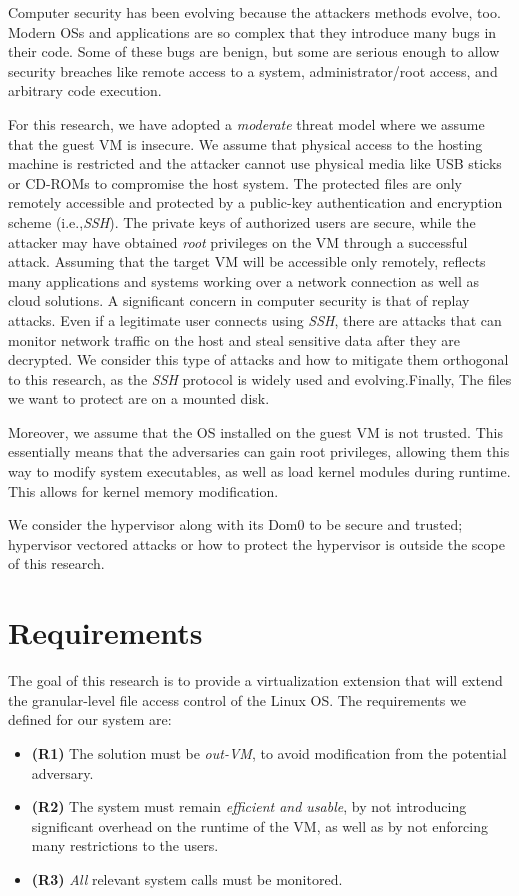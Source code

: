 Computer security has been evolving because the attackers methods evolve, too. Modern \acp{OS} and applications are so complex that they introduce many bugs in their code. Some of these bugs are benign, but some are serious enough to allow security breaches like remote access to a system, administrator/root access, and arbitrary code execution.

\par For this research, we have adopted a \emph{moderate} threat model where we assume that the guest \ac{VM} is insecure. We assume that physical access to the hosting machine is restricted and the attacker cannot use physical media like USB sticks or CD-ROMs to compromise the host system. The protected files are only remotely accessible and protected  by  a  public-key  authentication  and  encryption scheme (i.e.,\emph{SSH}). The  private  keys  of  authorized  users  are  secure, while the attacker may have obtained \emph{root} privileges on the \ac{VM} through a successful attack. Assuming that the target \ac{VM} will be accessible only remotely, reflects many applications and systems working over a network connection as well as cloud solutions. A significant  concern  in  computer security is that of replay attacks. Even if a legitimate user connects using \emph{SSH}, there are attacks that can monitor  network  traffic  on  the  host  and  steal  sensitive data after they are decrypted. We consider this type of attacks and how to mitigate them orthogonal to this research, as the \emph{SSH} protocol is widely used and evolving.Finally, The files we want to protect are on a mounted disk.

\par Moreover, we assume that the \ac{OS} installed on the guest \ac{VM} is not trusted. This essentially means that the adversaries can gain root privileges, allowing them this way to modify system executables, as well as load kernel modules during runtime. This allows for kernel memory modification.

\par We consider the hypervisor along with its Dom0 to be secure and trusted; hypervisor vectored attacks or how to protect the hypervisor is outside the scope of this research.

\section{Requirements}\label{sec:requirements}
The goal of this research is to provide a virtualization extension that will extend the granular-level file access control of the Linux \ac{OS}. The requirements we defined for our system are:
\begin{itemize}
	\item \textbf{(R1)} The solution must be \emph{out-\ac{VM}}, to avoid modification from the potential adversary. 
	\item \textbf{(R2)} The system must remain \emph{efficient and usable}, by not introducing significant overhead on the runtime of the \ac{VM}, as well as by not enforcing many restrictions to the users. 
	\item \textbf{(R3)} \emph{All} relevant system calls must be monitored.
\end{itemize}


